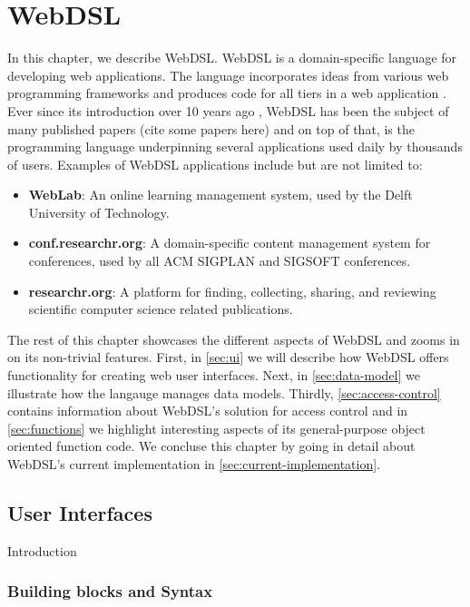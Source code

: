 
\chapter{\label{chap:webdsl}WebDSL}

  In this chapter, we describe WebDSL. WebDSL is a domain-specific language for developing web applications. The language incorporates ideas from various web programming frameworks and produces code for all tiers in a web application \autocite{Groenewegen2020}. Ever since its introduction over 10 years ago \autocite{Visser2007}, WebDSL has been the subject of many published papers (cite some papers here) and on top of that, is the programming language underpinning several applications used daily by thousands of users. Examples of WebDSL applications include but are not limited to:
  \begin{itemize}
    \item \textbf{WebLab}: An online learning management system, used by the Delft University of Technology.
    \item \textbf{conf.researchr.org}: A domain-specific content management system for conferences, used by all ACM SIGPLAN and SIGSOFT conferences.
    \item \textbf{researchr.org}: A platform for finding, collecting, sharing, and reviewing scientific computer science related publications.
  \end{itemize}

  The rest of this chapter showcases the different aspects of WebDSL and zooms in on its non-trivial features. First, in \cref{sec:ui} we will describe how WebDSL offers functionality for creating web user interfaces. Next, in \cref{sec:data-model} we illustrate how the langauge manages data models. Thirdly, \cref{sec:access-control} contains information about WebDSL's solution for access control and in \cref{sec:functions} we highlight interesting aspects of its general-purpose object oriented function code. We concluse this chapter by going in detail about WebDSL's current implementation in \cref{sec:current-implementation}.

  \section{\label{sec:ui}User Interfaces}

    Introduction

    \subsection{\label{subsec:building-blocks}Building blocks and Syntax}

